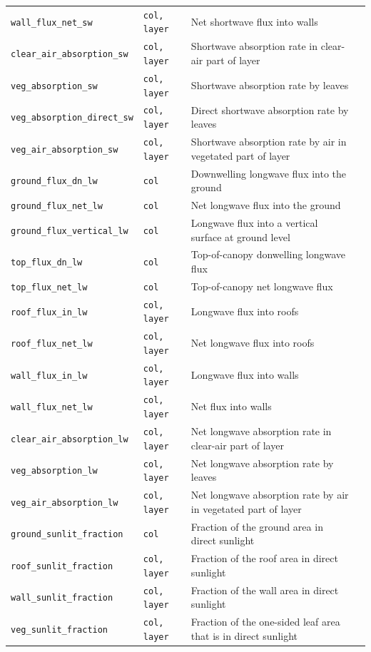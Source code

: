 \documentclass[a4,oneside]{article}
\def\codetabsize{\footnotesize}
\def\codetab#1{{\codetabsize\texttt{#1}}}
\begin{document}
{\begin{longtable}{llLp{7cm}}
\codetab{wall\_flux\_net\_sw} & \codetab{col, layer} & Net shortwave flux into walls\\
\codetab{clear\_air\_absorption\_sw} & \codetab{col, layer} & Shortwave absorption rate in clear-air part of layer\\
\codetab{veg\_absorption\_sw} & \codetab{col, layer} & Shortwave absorption rate by leaves\\
\codetab{veg\_absorption\_direct\_sw} & \codetab{col, layer} & Direct shortwave absorption rate by leaves\\
\codetab{veg\_air\_absorption\_sw} & \codetab{col, layer} & Shortwave absorption rate by air in vegetated part of layer\\
\codetab{ground\_flux\_dn\_lw} & \codetab{col} & Downwelling longwave flux into the ground\\
\codetab{ground\_flux\_net\_lw} & \codetab{col} & Net longwave flux into the ground\\
\codetab{ground\_flux\_vertical\_lw} & \codetab{col} & Longwave flux into a vertical surface at ground level\\
\codetab{top\_flux\_dn\_lw} & \codetab{col} & Top-of-canopy donwelling longwave flux\\
\codetab{top\_flux\_net\_lw} & \codetab{col} & Top-of-canopy net longwave flux\\
\codetab{roof\_flux\_in\_lw} & \codetab{col, layer} & Longwave flux into roofs\\
\codetab{roof\_flux\_net\_lw} & \codetab{col, layer} & Net longwave flux into roofs\\
\codetab{wall\_flux\_in\_lw} & \codetab{col, layer} & Longwave flux into walls\\
\codetab{wall\_flux\_net\_lw} & \codetab{col, layer} & Net flux into walls\\
\codetab{clear\_air\_absorption\_lw} & \codetab{col, layer} & Net longwave absorption rate in clear-air part of layer\\
\codetab{veg\_absorption\_lw} & \codetab{col, layer} & Net longwave absorption rate by leaves\\
\codetab{veg\_air\_absorption\_lw} & \codetab{col, layer} & Net longwave absorption rate by air in vegetated part of layer\\
\codetab{ground\_sunlit\_fraction} & \codetab{col} & Fraction of the ground area in direct sunlight\\
\codetab{roof\_sunlit\_fraction} & \codetab{col, layer} & Fraction of the roof area in direct sunlight\\
\codetab{wall\_sunlit\_fraction} & \codetab{col, layer} & Fraction of the wall area in direct sunlight\\
\codetab{veg\_sunlit\_fraction} & \codetab{col, layer} & Fraction of the one-sided leaf area that is in direct sunlight\\
\hline
\end{longtable}
}
\end{document}
